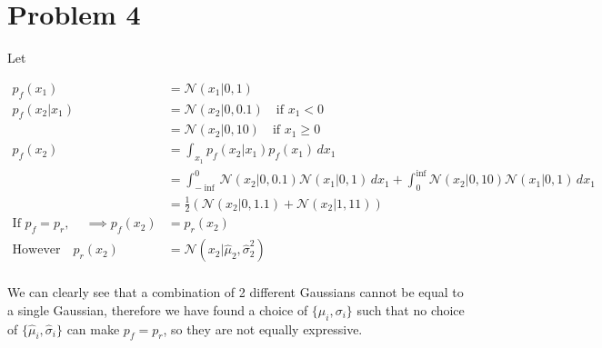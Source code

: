 \documentclass[12pt]{article}
\begin{document}
\section*{Problem 4}
Let

\begin{align*}
  p_f(x_1) &= \mathcal{N}(x_1 | 0,1) \\
  p_f(x_2 | x_1) &= \mathcal{N}(x_2 | 0,  0.1)    \quad \text{if } x_1 < 0 \\
                 &= \mathcal{N}(x_2 | 0, 10)    \quad \text{if } x_1 \geq 0 \\
  p_f(x_2) &= \int_{x_1}  p_f(x_2 | x_1) p_f(x_1) \,dx_1 \\
  &= \int_{-\inf}^{0} \mathcal{N}(x_2 | 0,0.1) \mathcal{N}(x_1 | 0,1) \,dx_1 + \int_{0}^{\inf} \mathcal{N}(x_2 | 0,10) \mathcal{N}(x_1 | 0,1) \,dx_1 \\
  &= \frac{1}{2} (\mathcal{N}(x_2 | 0,1.1) + \mathcal{N}(x_2 | 1,11)) \\
  \text{If $p_f = p_r$, } \quad \implies p_f(x_2) &= p_r(x_2) \\
  \text{However} \quad p_r(x_2) &= \mathcal{N}(x_2 | \hat{\mu}_2, \hat{\sigma}^2_2) \\
  \end{align*}
  
  We can clearly see that a combination of 2 different Gaussians cannot be equal to a single Gaussian, therefore we have found a choice of $\{\mu_i, \sigma_i\}$ 
  such that no choice of $\{\hat{\mu}_i, \hat{\sigma}_i\}$ can make $p_f = p_r$, so they are not equally expressive.
\end{document}
